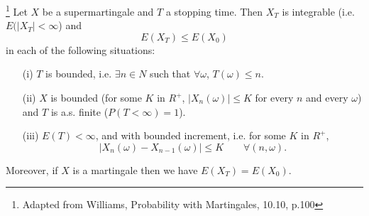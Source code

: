 \begin{theorem} \label{T:OST}
\footnote{Adapted from Williams, Probability with Martingales, 10.10, p.100}
Let $X$ be a supermartingale and $T$ a stopping time. Then $X_T$ is integrable 
(i.e. $E(|X_T|<\infty$) and
\[
  E(X_T) \le E(X_0)
\]
in each of the following situations:
\begin{itemize}
  \item[(i)] $T$ is bounded, i.e. $\exists n\in N$ such that 
             $\forall\omega$, $T(\omega)\le n$.
  \item[(ii)] $X$ is bounded (for some $K$ in $R^+$, $|X_n(\omega)|\le K$ for 
              every $n$ and every $\omega$) and $T$ is a.s. finite 
              ($P(T<\infty)=1$).
  \item[(iii)] $E(T)<\infty$, and with bounded increment, i.e. for some $K$ in
               $R^+$, 
               \[
                 |X_n(\omega)-X_{n-1}(\omega)|\le K \qquad \forall (n,\omega).
               \]
\end{itemize}
Moreover, if $X$ is a martingale then we have $E(X_T)=E(X_0)$.
\end{theorem}
